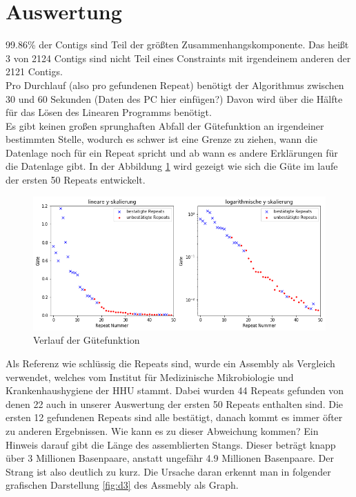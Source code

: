 \documentclass[12pt,ngerman,titlepage,a4paper]{article}
\begin{document}
\section{Auswertung}
99.86\% der Contigs sind Teil der größten Zusammenhangskomponente. Das heißt 3 von 2124 Contigs sind nicht Teil eines Constraints mit irgendeinem anderen der 2121 Contigs.\\
Pro Durchlauf (also pro gefundenen Repeat) benötigt der Algorithmus zwischen 30 und 60 Sekunden (Daten des PC hier einfügen?) Davon wird über die Hälfte für das Lösen des Linearen Programms benötigt.\\
Es gibt keinen großen sprunghaften Abfall der Gütefunktion an irgendeiner bestimmten Stelle, wodurch es schwer ist eine Grenze zu ziehen, wann die Datenlage noch für ein Repeat spricht und ab wann es andere Erklärungen für die Datenlage gibt.
In der Abbildung \ref{fig:gute} wird gezeigt wie sich die Güte im laufe der ersten 50 Repeats entwickelt.
\begin{figure} 
\includegraphics[width=1\textwidth]{gute}
\caption{Verlauf der Gütefunktion}%
\label{fig:gute}
\end{figure}
Als Referenz wie schlüssig die Repeats sind, wurde ein Assembly als Vergleich verwendet, welches vom Institut für Medizinische Mikrobiologie und Krankenhaushygiene der HHU stammt.
Dabei wurden 44 Repeats gefunden von denen 22 auch in unserer Auswertung der ersten 50 Repeats enthalten sind. Die ersten 12 gefundenen Repeats sind alle bestätigt, danach kommt es immer öfter zu anderen Ergebnissen. Wie kann es zu dieser Abweichung kommen? Ein Hinweis darauf gibt die Länge des assemblierten Stangs. Dieser beträgt knapp über 3 Millionen Basenpaare, anstatt ungefähr 4.9 Millionen Basenpaare. Der Strang ist also deutlich zu kurz. Die Ursache daran erkennt man in folgender grafischen Darstellung \ref{fig:d3} des Assmebly als Graph.
\end{document}
